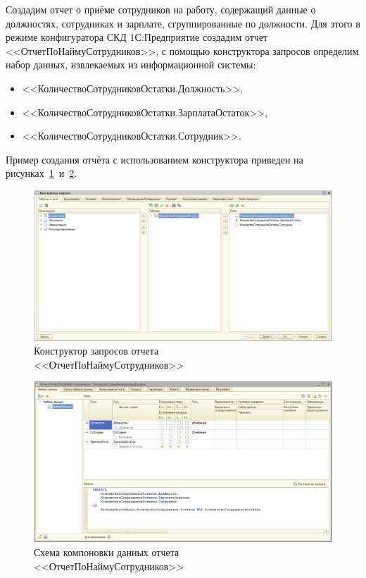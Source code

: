 Создадим отчет о приёме сотрудников на работу,
содержащий данные о должностях, сотрудниках и зарплате,
сгруппированные по должности.
Для этого в режиме конфигуратора СКД 1С:Предприятие создадим отчет
<<ОтчетПоНаймуСотрудников>>, с помощью конструктора запросов
определим набор данных, извлекаемых из информационной системы:
\begin{itemize}
  \item <<КоличествоСотрудниковОстатки.Должность>>,
  \item <<КоличествоСотрудниковОстатки.ЗарплатаОстаток>>,
  \item <<КоличествоСотрудниковОстатки.Сотрудник>>.
\end{itemize}

\pagebreak

Пример создания отчёта с использованием конструктора приведен
на рисунках~\ref{fig:report_constructor}~и~\ref{fig:report_scheme}.

\begin{figure}[h!]
  \centering
  \includegraphics[width=160mm]{pic/report_constructor}
  \caption{Конструктор запросов отчета \\ <<ОтчетПоНаймуСотрудников>>}
  \label{fig:report_constructor}
\end{figure}

\begin{figure}[h!]
  \centering
  \includegraphics[width=160mm]{pic/report_scheme}
  \caption{Схема компоновки данных отчета \\ <<ОтчетПоНаймуСотрудников>>}
  \label{fig:report_scheme}
\end{figure}


